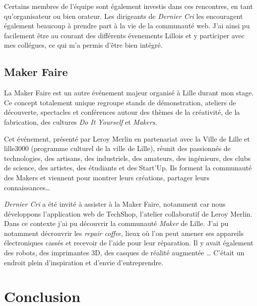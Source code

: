 \bigskip

Certains membres de l'équipe sont également investis dans ces
rencontres, en tant qu'organisateur ou bien orateur. Les dirigeants de
\emph{Dernier Cri} les encouragent également beaucoup à prendre part à
la vie de la communauté web. J'ai ainsi pu facilement être au courant
des différents évenements Lillois et y participer avec mes collégues, ce
qui m'a permis d'être bien intégré.

\bigskip

\subsection{Maker Faire}\label{maker-faire}

\bigskip

La Maker Faire est un autre événement majeur organisé à Lille durant mon
stage. Ce concept totalement unique regroupe stands de démonstration,
ateliers de découverte, spectacles et conférences autour des thèmes de
la créativité, de la fabrication, des cultures \emph{Do It Yourself} et
\emph{Makers}.

\bigskip

Cet événement, présenté par Leroy Merlin en partenariat avec la Ville de
Lille et lille3000 (programme culturel de la ville de Lille), réunit des
passionnés de technologies, des artisans, des industriels, des amateurs,
des ingénieurs, des clubs de science, des artistes, des étudiants et des
Start'Up. Ils forment la communauté des Makers et viennent pour montrer
leurs créations, partager leurs connaissances\ldots{}

\bigskip

\emph{Dernier Cri} a été invité à assister à la Maker Faire, notamment
car nous développons l'application web de TechShop, l'atelier
collaboratif de Leroy Merlin. Dans ce contexte j'ai pu découvrir la
communauté \emph{Maker} de Lille. J'ai pu notamment décrouvrir les
\emph{repair coffee}, lieux où l'on peut amener ses appareils
électroniques cassés et recevoir de l'aide pour leur réparation. Il y
avait également des robots, des imprimantes 3D, des casques de réalité
augmentée \ldots{} C'était un endroit plein d'inspiration et d'envie
d'entreprendre.

\newpage

\section{Conclusion}\label{conclusion-2}

